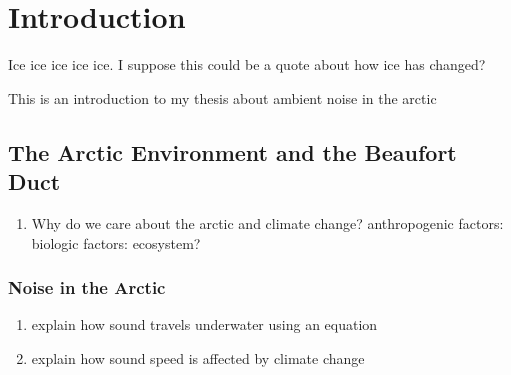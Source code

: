 
\chapter{Introduction}  \label{introduction}

\begin{center}
  \begin{minipage}{0.5\textwidth}
    \begin{small}
      Ice ice ice ice ice. I suppose this could be a quote about how ice has changed?
    \end{small}
  \end{minipage}
  \vspace{0.5cm}
\end{center}

\noindent This is an introduction to my thesis about ambient noise in the arctic

\section{The Arctic Environment and the Beaufort Duct} \label{intro_enviro}

\begin{enumerate}
\item Why do we care about the arctic and climate change?
anthropogenic factors:
biologic factors:
ecosystem?

\end{enumerate}



\subsection{Noise in the Arctic}    \label{intro_arctic_noise}
\begin{enumerate}
\item explain how sound travels underwater using an equation

\item explain how sound speed is affected by climate change
\end{enumerate}

